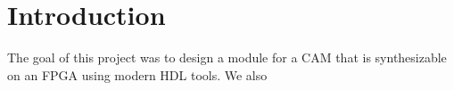\section{Introduction}
The goal of this project was to design a module for a CAM that is synthesizable on an FPGA using modern HDL tools. 
We also 